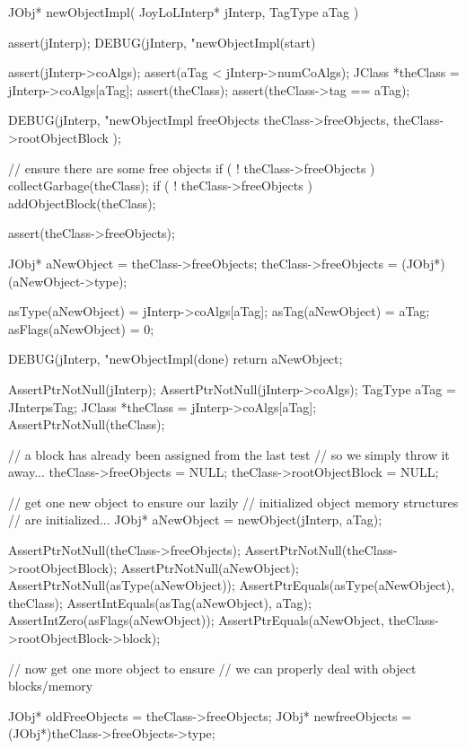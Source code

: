 \startCCode
JObj* newObjectImpl(
  JoyLoLInterp* jInterp,
  TagType aTag
) {
  assert(jInterp);
  DEBUG(jInterp, "newObjectImpl(start) %
  
  assert(jInterp->coAlgs);
  assert(aTag < jInterp->numCoAlgs);
  JClass *theClass = jInterp->coAlgs[aTag];
  assert(theClass);
  assert(theClass->tag == aTag);

  DEBUG(jInterp, "newObjectImpl freeObjects %
    theClass->freeObjects,
    theClass->rootObjectBlock
  ); 

  // ensure there are some free objects
  if ( ! theClass->freeObjects ) 
    collectGarbage(theClass);
  if ( ! theClass->freeObjects )
    addObjectBlock(theClass);

  assert(theClass->freeObjects);

  JObj* aNewObject   = theClass->freeObjects;
  theClass->freeObjects = (JObj*)(aNewObject->type);

  asType(aNewObject)  = jInterp->coAlgs[aTag];
  asTag(aNewObject)   = aTag;
  asFlags(aNewObject) = 0;
  
  DEBUG(jInterp, "newObjectImpl(done) %
  return aNewObject;
}
\stopCCode

\startCTest
  AssertPtrNotNull(jInterp);
  AssertPtrNotNull(jInterp->coAlgs);
  TagType aTag = JInterpsTag;
  JClass *theClass = jInterp->coAlgs[aTag];
  AssertPtrNotNull(theClass);
  
  // a block has already been assigned from the last test
  // so we simply throw it away...
  theClass->freeObjects = NULL;
  theClass->rootObjectBlock = NULL;

  // get one new object to ensure our lazily
  // initialized object memory structures 
  // are initialized...
  JObj* aNewObject = newObject(jInterp, aTag);
  
  AssertPtrNotNull(theClass->freeObjects);
  AssertPtrNotNull(theClass->rootObjectBlock);
  AssertPtrNotNull(aNewObject);
  AssertPtrNotNull(asType(aNewObject));
  AssertPtrEquals(asType(aNewObject), theClass);
  AssertIntEquals(asTag(aNewObject), aTag);
  AssertIntZero(asFlags(aNewObject));
  AssertPtrEquals(aNewObject,
    theClass->rootObjectBlock->block);

  // now get one more object to ensure
  // we can properly deal with object blocks/memory
  
  JObj* oldFreeObjects =
    theClass->freeObjects;
  JObj* newfreeObjects = 
    (JObj*)theClass->freeObjects->type;

